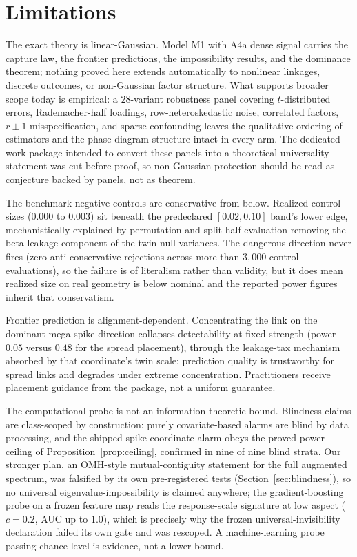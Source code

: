 \section{Limitations}
\label{sec:limitations}

The exact theory is linear-Gaussian. Model M1 with A4a dense signal carries the capture law, the frontier predictions, the impossibility results, and the dominance theorem; nothing proved here extends automatically to nonlinear linkages, discrete outcomes, or non-Gaussian factor structure. What supports broader scope today is empirical: a $28$-variant robustness panel covering $t$-distributed errors, Rademacher-half loadings, row-heteroskedastic noise, correlated factors, $r \pm 1$ misspecification, and sparse confounding leaves the qualitative ordering of estimators and the phase-diagram structure intact in every arm. The dedicated work package intended to convert these panels into a theoretical universality statement was cut before proof, so non-Gaussian protection should be read as conjecture backed by panels, not as theorem.

The benchmark negative controls are conservative from below. Realized control sizes ($0.000$ to $0.003$) sit beneath the predeclared $[0.02, 0.10]$ band's lower edge, mechanistically explained by permutation and split-half evaluation removing the beta-leakage component of the twin-null variances. The dangerous direction never fires (zero anti-conservative rejections across more than $3{,}000$ control evaluations), so the failure is of literalism rather than validity, but it does mean realized size on real geometry is below nominal and the reported power figures inherit that conservatism.

Frontier prediction is alignment-dependent. Concentrating the link on the dominant mega-spike direction collapses detectability at fixed strength (power $0.05$ versus $0.48$ for the spread placement), through the leakage-tax mechanism absorbed by that coordinate's twin scale; prediction quality is trustworthy for spread links and degrades under extreme concentration. Practitioners receive placement guidance from the package, not a uniform guarantee.

The computational probe is not an information-theoretic bound. Blindness claims are class-scoped by construction: purely covariate-based alarms are blind by data processing, and the shipped spike-coordinate alarm obeys the proved power ceiling of Proposition~\ref{prop:ceiling}, confirmed in nine of nine blind strata. Our stronger plan, an OMH-style mutual-contiguity statement for the full augmented spectrum, was falsified by its own pre-registered tests (Section~\ref{sec:blindness}), so no universal eigenvalue-impossibility is claimed anywhere; the gradient-boosting probe on a frozen feature map reads the response-scale signature at low aspect ($c = 0.2$, AUC up to $1.0$), which is precisely why the frozen universal-invisibility declaration failed its own gate and was rescoped. A machine-learning probe passing chance-level is evidence, not a lower bound.

